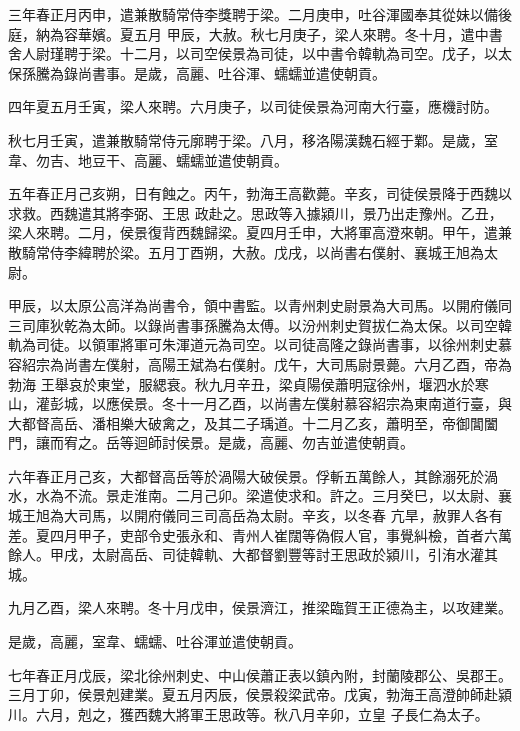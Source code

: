 \begin{pinyinscope}
 三年春正月丙申，遣兼散騎常侍李獎聘于梁。二月庚申，吐谷渾國奉其從妹以備後庭，納為容華嬪。夏五月
 甲辰，大赦。秋七月庚子，梁人來聘。冬十月，遣中書舍人尉瑾聘于梁。十二月，以司空侯景為司徒，以中書令韓軌為司空。戊子，以太保孫騰為錄尚書事。是歲，高麗、吐谷渾、蠕蠕並遣使朝貢。



 四年夏五月壬寅，梁人來聘。六月庚子，以司徒侯景為河南大行臺，應機討防。



 秋七月壬寅，遣兼散騎常侍元廓聘于梁。八月，移洛陽漢魏石經于鄴。是歲，室韋、勿吉、地豆干、高麗、蠕蠕並遣使朝貢。



 五年春正月己亥朔，日有蝕之。丙午，勃海王高歡薨。辛亥，司徒侯景降于西魏以求救。西魏遣其將李弼、王思
 政赴之。思政等入據潁川，景乃出走豫州。乙丑，梁人來聘。二月，侯景復背西魏歸梁。夏四月壬申，大將軍高澄來朝。甲午，遣兼散騎常侍李緯聘於梁。五月丁酉朔，大赦。戊戌，以尚書右僕射、襄城王旭為太尉。



 甲辰，以太原公高洋為尚書令，領中書監。以青州刺史尉景為大司馬。以開府儀同三司庫狄乾為太師。以錄尚書事孫騰為太傅。以汾州刺史賀拔仁為太保。以司空韓軌為司徒。以領軍將軍可朱渾道元為司空。以司徒高隆之錄尚書事，以徐州刺史慕容紹宗為尚書左僕射，高陽王斌為右僕射。戊午，大司馬尉景薨。六月乙酉，帝為勃海
 王舉哀於東堂，服緦衰。秋九月辛丑，梁貞陽侯蕭明寇徐州，堰泗水於寒山，灌彭城，以應侯景。冬十一月乙酉，以尚書左僕射慕容紹宗為東南道行臺，與大都督高岳、潘相樂大破禽之，及其二子瑀道。十二月乙亥，蕭明至，帝御閶闔門，讓而宥之。岳等迴師討侯景。是歲，高麗、勿吉並遣使朝貢。



 六年春正月己亥，大都督高岳等於渦陽大破侯景。俘斬五萬餘人，其餘溺死於渦水，水為不流。景走淮南。二月己卯。梁遣使求和。許之。三月癸巳，以太尉、襄城王旭為大司馬，以開府儀同三司高岳為太尉。辛亥，以冬春
 亢旱，赦罪人各有差。夏四月甲子，吏部令史張永和、青州人崔闊等偽假人官，事覺糾檢，首者六萬餘人。甲戌，太尉高岳、司徒韓軌、大都督劉豐等討王思政於潁川，引洧水灌其城。



 九月乙酉，梁人來聘。冬十月戊申，侯景濟江，推梁臨賀王正德為主，以攻建業。



 是歲，高麗，室韋、蠕蠕、吐谷渾並遣使朝貢。



 七年春正月戊辰，梁北徐州刺史、中山侯蕭正表以鎮內附，封蘭陵郡公、吳郡王。三月丁卯，侯景剋建業。夏五月丙辰，侯景殺梁武帝。戊寅，勃海王高澄帥師赴潁川。六月，剋之，獲西魏大將軍王思政等。秋八月辛卯，立皇
 子長仁為太子。




\end{pinyinscope}
